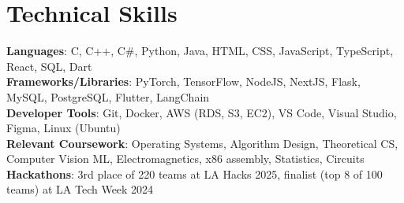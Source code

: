 \documentclass[letterpaper,11pt]{article}
\begin{document}
\section{Technical Skills}
 \begin{itemize}[leftmargin=0.15in, label={}]
    \small{\item{
     \textbf{Languages}{: C, C++, C\#, Python, Java, HTML, CSS, JavaScript, TypeScript, React, SQL, Dart} \\
     \textbf{Frameworks/Libraries}{: PyTorch, TensorFlow, NodeJS, NextJS, Flask, MySQL, PostgreSQL, Flutter, LangChain} \\
     \textbf{Developer Tools}{: Git, Docker, AWS (RDS, S3, EC2), VS Code, Visual Studio, Figma, Linux (Ubuntu)} \\
     \textbf{Relevant Coursework}{: Operating Systems, Algorithm Design, Theoretical CS, Computer Vision ML, Electromagnetics, x86 assembly, Statistics, Circuits} \\
     \textbf{Hackathons}{: 3rd place of 220 teams at LA Hacks 2025, finalist (top 8 of 100 teams) at LA Tech Week 2024} \\
    }}
 \end{itemize}


\end{document}
